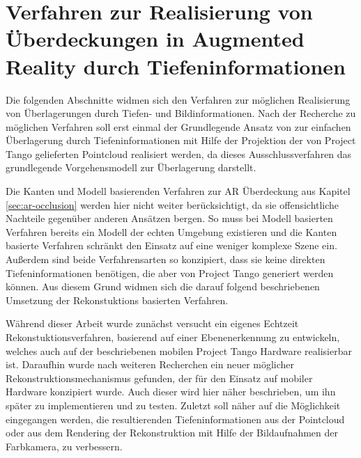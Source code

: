 \chapter{Verfahren zur Realisierung von Überdeckungen in Augmented Reality durch Tiefen\-informationen} \label{sec:optimization}


Die folgenden Abschnitte widmen sich den Verfahren zur möglichen Realisierung von Überlagerungen durch Tiefen- und Bildinformationen. Nach der Recherche zu möglichen Verfahren soll erst einmal der Grundlegende Ansatz von \citet{wloka1995resolving} zur einfachen Überlagerung durch Tiefeninformationen mit Hilfe der Projektion der von Project Tango gelieferten Pointcloud realisiert werden, da dieses Ausschlussverfahren das grundlegende Vorgehensmodell zur Überlagerung darstellt. 

Die Kanten und Modell basierenden Verfahren zur AR Überdeckung aus Kapitel \ref{sec:ar-occlusion} werden hier nicht weiter berücksichtigt, da sie offensichtliche Nachteile gegenüber anderen Ansätzen bergen. So muss bei Modell basierten Verfahren bereits ein Modell der echten Umgebung existieren und die Kanten basierte Verfahren schränkt den Einsatz auf eine weniger komplexe Szene ein. Außerdem sind beide Verfahrensarten so konzipiert, dass sie keine direkten Tiefeninformationen benötigen, die aber von Project Tango generiert werden können. Aus diesem Grund widmen sich die darauf folgend beschriebenen Umsetzung der Rekonstuktions basierten Verfahren.

Während dieser Arbeit wurde zunächst versucht ein eigenes Echtzeit Rekonstuktionsverfahren, basierend auf einer Ebenenerkennung zu entwickeln, welches auch auf der beschriebenen mobilen Project Tango Hardware realisierbar ist. Daraufhin wurde nach weiteren Recherchen ein neuer möglicher Rekonstruktionsmechanismus gefunden, der für den Einsatz auf mobiler Hardware konzipiert wurde. Auch dieser wird hier näher beschrieben, um ihn später zu implementieren und zu testen. Zuletzt soll näher auf die Möglichkeit eingegangen werden, die resultierenden Tiefeninformationen aus der Pointcloud oder aus dem Rendering der Rekonstruktion mit Hilfe der Bildaufnahmen der Farbkamera, zu verbessern. 









